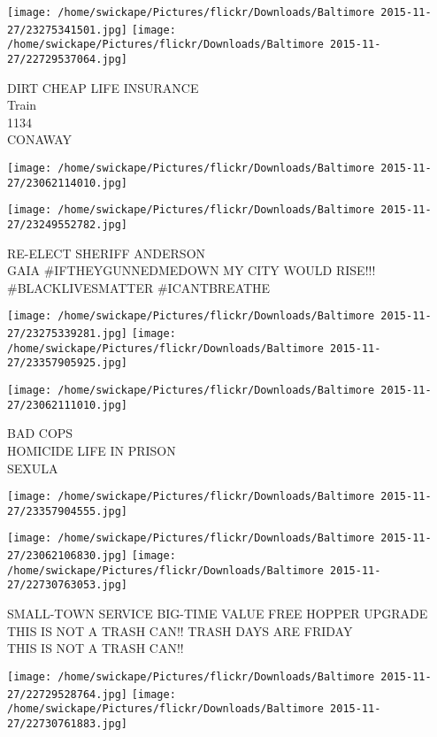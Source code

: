 \documentclass[10pt,letterpaper]{article}
\begin{document}
\texttt{[image: /home/swickape/Pictures/flickr/Downloads/Baltimore 2015-11-27/23275341501.jpg]}
\texttt{[image: /home/swickape/Pictures/flickr/Downloads/Baltimore 2015-11-27/22729537064.jpg]}

DIRT CHEAP LIFE INSURANCE\\
Train\\
1134\\
CONAWAY
\pagebreak

\texttt{[image: /home/swickape/Pictures/flickr/Downloads/Baltimore 2015-11-27/23062114010.jpg]}

\vspace{0.25in}
\texttt{[image: /home/swickape/Pictures/flickr/Downloads/Baltimore 2015-11-27/23249552782.jpg]}

RE{-}ELECT SHERIFF ANDERSON\\
GAIA \#IFTHEYGUNNEDMEDOWN MY CITY WOULD RISE!!! \#BLACKLIVESMATTER \#ICANTBREATHE
\pagebreak

\texttt{[image: /home/swickape/Pictures/flickr/Downloads/Baltimore 2015-11-27/23275339281.jpg]}
\texttt{[image: /home/swickape/Pictures/flickr/Downloads/Baltimore 2015-11-27/23357905925.jpg]}

\vspace{0.25in}
\texttt{[image: /home/swickape/Pictures/flickr/Downloads/Baltimore 2015-11-27/23062111010.jpg]}

BAD COPS\\
HOMICIDE LIFE IN PRISON\\
SEXULA
\pagebreak

\texttt{[image: /home/swickape/Pictures/flickr/Downloads/Baltimore 2015-11-27/23357904555.jpg]}

\vspace{0.25in}
\texttt{[image: /home/swickape/Pictures/flickr/Downloads/Baltimore 2015-11-27/23062106830.jpg]}
\texttt{[image: /home/swickape/Pictures/flickr/Downloads/Baltimore 2015-11-27/22730763053.jpg]}

SMALL{-}TOWN SERVICE BIG{-}TIME VALUE FREE HOPPER UPGRADE\\
THIS IS NOT A TRASH CAN!!  TRASH DAYS ARE FRIDAY\\
THIS IS NOT A TRASH CAN!!
\pagebreak

\texttt{[image: /home/swickape/Pictures/flickr/Downloads/Baltimore 2015-11-27/22729528764.jpg]}
\texttt{[image: /home/swickape/Pictures/flickr/Downloads/Baltimore 2015-11-27/22730761883.jpg]}
\end{document}
